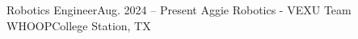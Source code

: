 \resumeSubheading
  {Robotics Engineer}{Aug. 2024 -- Present}
  {Aggie Robotics - VEXU Team WHOOP}{College Station, TX}
  \resumeItemListStart
    
  \resumeItemListEnd
